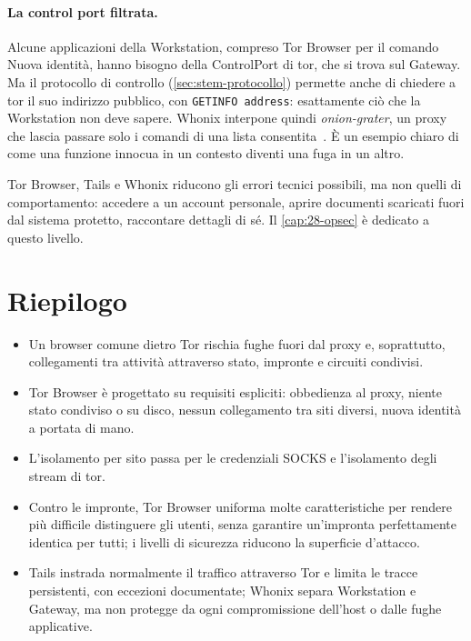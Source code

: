 \paragraph{La control port filtrata.} Alcune applicazioni della Workstation, compreso Tor Browser per il comando Nuova identità, hanno bisogno della ControlPort di tor, che si trova sul Gateway. Ma il protocollo di controllo (\cref{sec:stem-protocollo}) permette anche di chiedere a tor il suo indirizzo pubblico, con \texttt{GETINFO address}: esattamente ciò che la Workstation non deve sapere. Whonix interpone quindi \emph{onion-grater}, un proxy che lascia passare solo i comandi di una lista consentita~\cite{whonixgrater}. È un esempio chiaro di come una funzione innocua in un contesto diventi una fuga in un altro.

\begin{attenzione}
Tor Browser, Tails e Whonix riducono gli errori tecnici possibili, ma non quelli di comportamento: accedere a un account personale, aprire documenti scaricati fuori dal sistema protetto, raccontare dettagli di sé. Il \cref{cap:28-opsec} è dedicato a questo livello.
\end{attenzione}

\section*{Riepilogo}
\begin{itemize}
  \item Un browser comune dietro Tor rischia fughe fuori dal proxy e, soprattutto, collegamenti tra attività attraverso stato, impronte e circuiti condivisi.
  \item Tor Browser è progettato su requisiti espliciti: obbedienza al proxy, niente stato condiviso o su disco, nessun collegamento tra siti diversi, nuova identità a portata di mano.
  \item L'isolamento per sito passa per le credenziali SOCKS e l'isolamento degli stream di tor.
  \item Contro le impronte, Tor Browser uniforma molte caratteristiche per rendere più difficile distinguere gli utenti, senza garantire un'impronta perfettamente identica per tutti; i livelli di sicurezza riducono la superficie d'attacco.
  \item Tails instrada normalmente il traffico attraverso Tor e limita le tracce persistenti, con eccezioni documentate; Whonix separa Workstation e Gateway, ma non protegge da ogni compromissione dell'host o dalle fughe applicative.
\end{itemize}

